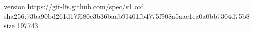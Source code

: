 version https://git-lfs.github.com/spec/v1
oid sha256:73ba90bd261d17f680e3b36baab90401fb4775f908a5aae1ea0a0bb7304d75b8
size 197743
